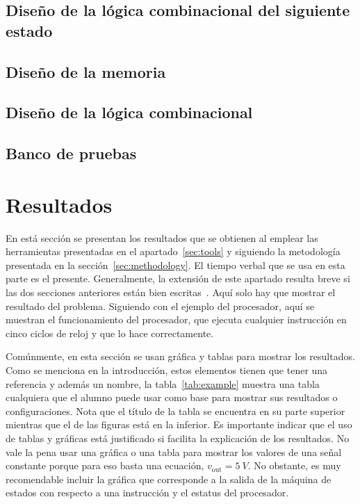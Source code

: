 \documentclass[12pt]{article}
\begin{document}
\subsection{Diseño de la lógica combinacional del siguiente estado}

\subsection{Diseño de la memoria}

\subsection{Diseño de la lógica combinacional}

\subsection{Banco de pruebas}

\section{Resultados}\label{sec:results}

En está sección se presentan los resultados que se obtienen al emplear las 
herramientas presentadas en el apartado~\ref{sec:tools} y siguiendo la 
metodología presentada en la sección~\ref{sec:methodology}. El tiempo verbal 
que se usa en esta parte es el presente. Generalmente, la extensión de este 
apartado resulta breve si las dos secciones anteriores están bien 
escritas~\cite{DaRo05}. Aquí solo hay que mostrar el resultado del problema. 
Siguiendo con el ejemplo del procesador, aquí se muestran el funcionamiento 
del procesador, \eg que ejecuta cualquier instrucción en cinco ciclos de 
reloj y que lo hace correctamente.

Comúnmente, en esta sección se usan gráfica y tablas para mostrar los 
resultados. Como se menciona en la introducción, estos elementos tienen que 
tener una referencia y además un nombre, \eg la tabla~\ref{tab:example} 
muestra una tabla cualquiera que el alumno puede usar como base para mostrar 
sus resultados o configuraciones. Nota que el título de la tabla se encuentra 
en su parte superior mientras que el de las figuras está en la inferior. Es 
importante indicar que el uso de tablas y gráficas está justificado si facilita 
la explicación de los resultados. No vale la pena usar una gráfica o una tabla 
para mostrar los valores de una señal constante porque para eso basta una 
ecuación, \eg $v_\mathrm{out} = \SI{5}{V}$. No obstante, es muy recomendable 
incluir la gráfica que corresponde a la salida de la máquina de estados con 
respecto a una instrucción y el estatus del procesador.
\end{document}
